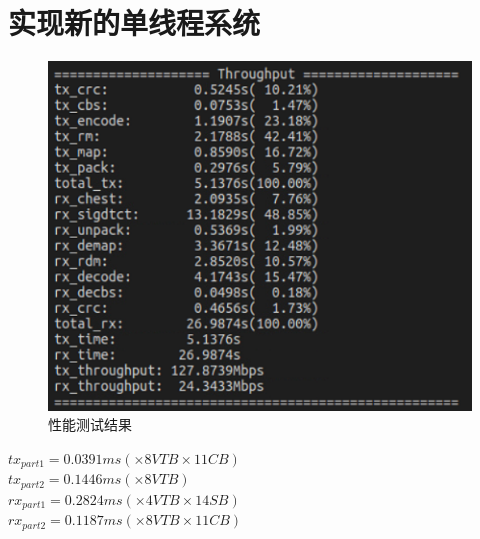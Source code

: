 \documentclass{article}
\begin{document}
\section{实现新的单线程系统}
\begin{figure}[H]
	\centering
	\includegraphics[width = .6\textwidth]{res.png}
	\caption{性能测试结果}
\end{figure}
$tx_{part1} = 0.0391ms(\times 8VTB\times 11CB)$\\
$tx_{part2} = 0.1446ms(\times 8VTB)$\\
$rx_{part1} = 0.2824ms(\times 4VTB\times 14SB)$\\
$rx_{part2} = 0.1187ms(\times 8VTB\times 11CB)$


\end{document}
